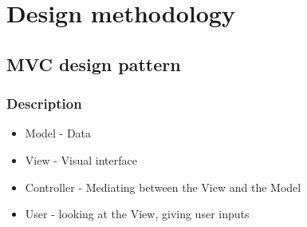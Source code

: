 \chapter{Design methodology}
\section{MVC design pattern}
\subsection{Description}
\begin{itemize}
\item Model - Data
\item View - Visual interface
\item Controller - Mediating between the View and the Model
\item User - looking at the View, giving user inputs
\end{itemize}

      
    
    
  
  
  
  